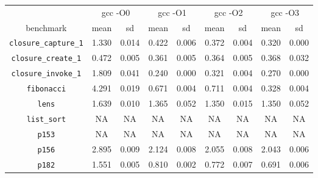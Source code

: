 \documentclass[12pt,a4paper,twoside,openright]{report}
\begin{document}
\begin{figure}[h]
\begin{tabular}{| c | c c | c c | c c | c c |}
  \hline
  & \multicolumn{2}{c|}{gcc -O0}
  & \multicolumn{2}{c|}{gcc -O1}
  & \multicolumn{2}{c|}{gcc -O2}
  & \multicolumn{2}{c|}{gcc -O3}
  \\
benchmark                     & mean  & sd    & mean  & sd    & mean  & sd    & mean  & sd    \\
  \hline
\lstinline!closure_capture_1! & \cellcolor[hsb]{0.3,0.266,1}1.330 & 0.014 & \cellcolor[hsb]{0.3,0.767,1}0.422 & 0.006 & \cellcolor[hsb]{0.3,0.795,1}0.372 & 0.004 & \cellcolor[hsb]{0.3,0.823,1}0.320 & 0.000 \\
\lstinline!closure_create_1!  & \cellcolor[hsb]{0.0,0.975,1}0.472 & 0.005 & \cellcolor[hsb]{0.0,0.628,1}0.361 & 0.005 & \cellcolor[hsb]{0.0,0.635,1}0.364 & 0.005 & \cellcolor[hsb]{0.0,0.648,1}0.368 & 0.032 \\
\lstinline!closure_invoke_1!  & \cellcolor[hsb]{0.3,0.175,1}1.809 & 0.041 & \cellcolor[hsb]{0.3,0.890,1}0.240 & 0.000 & \cellcolor[hsb]{0.3,0.854,1}0.321 & 0.004 & \cellcolor[hsb]{0.3,0.877,1}0.270 & 0.000 \\
\lstinline!fibonacci!         & \cellcolor[hsb]{0.0,0.178,1}4.291 & 0.019 & \cellcolor[hsb]{0.3,0.788,1}0.671 & 0.004 & \cellcolor[hsb]{0.3,0.775,1}0.711 & 0.004 & \cellcolor[hsb]{0.3,0.896,1}0.328 & 0.004 \\
\lstinline!lens!              & \cellcolor[hsb]{0.0,1.000,1}1.639 & 0.010 & \cellcolor[hsb]{0.0,1.000,1}1.365 & 0.052 & \cellcolor[hsb]{0.0,1.000,1}1.350 & 0.015 & \cellcolor[hsb]{0.0,1.000,1}1.350 & 0.052 \\
\lstinline!list_sort!         &                                NA &    NA &                                NA &    NA &                                NA &    NA &                                NA &    NA \\
\lstinline!p153!              &                                NA &    NA &                                NA &    NA &                                NA &    NA &                                NA &    NA \\
\lstinline!p156!              & \cellcolor[hsb]{0.0,0.913,1}2.895 & 0.009 & \cellcolor[hsb]{0.0,0.536,1}2.124 & 0.008 & \cellcolor[hsb]{0.0,0.503,1}2.055 & 0.008 & \cellcolor[hsb]{0.0,0.497,1}2.043 & 0.006 \\
\lstinline!p182!              & \cellcolor[hsb]{0.0,0.198,1}1.551 & 0.005 & \cellcolor[hsb]{0.3,0.271,1}0.810 & 0.002 & \cellcolor[hsb]{0.3,0.305,1}0.772 & 0.007 & \cellcolor[hsb]{0.3,0.378,1}0.691 & 0.006 \\

\end{tabular}
\end{figure}
\end{document}
